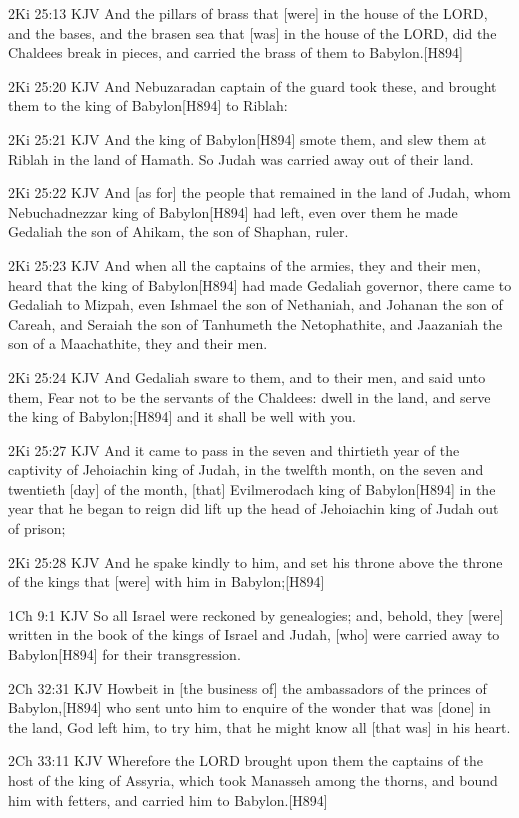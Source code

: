 \documentclass{book}
\begin{document}
2Ki 25:13 KJV
And the pillars of brass that [were] in the house of the LORD, and the bases, and the brasen sea that [was] in the house of the LORD, did the Chaldees break in pieces, and carried the brass of them to Babylon.[H894]

2Ki 25:20 KJV
And Nebuzaradan captain of the guard took these, and brought them to the king of Babylon[H894] to Riblah:

2Ki 25:21 KJV
And the king of Babylon[H894] smote them, and slew them at Riblah in the land of Hamath. So Judah was carried away out of their land.

2Ki 25:22 KJV
And [as for] the people that remained in the land of Judah, whom Nebuchadnezzar king of Babylon[H894] had left, even over them he made Gedaliah the son of Ahikam, the son of Shaphan, ruler.

2Ki 25:23 KJV
And when all the captains of the armies, they and their men, heard that the king of Babylon[H894] had made Gedaliah governor, there came to Gedaliah to Mizpah, even Ishmael the son of Nethaniah, and Johanan the son of Careah, and Seraiah the son of Tanhumeth the Netophathite, and Jaazaniah the son of a Maachathite, they and their men.

2Ki 25:24 KJV
And Gedaliah sware to them, and to their men, and said unto them, Fear not to be the servants of the Chaldees: dwell in the land, and serve the king of Babylon;[H894] and it shall be well with you.

2Ki 25:27 KJV
And it came to pass in the seven and thirtieth year of the captivity of Jehoiachin king of Judah, in the twelfth month, on the seven and twentieth [day] of the month, [that] Evilmerodach king of Babylon[H894] in the year that he began to reign did lift up the head of Jehoiachin king of Judah out of prison;

2Ki 25:28 KJV
And he spake kindly to him, and set his throne above the throne of the kings that [were] with him in Babylon;[H894]

1Ch 9:1 KJV
So all Israel were reckoned by genealogies; and, behold, they [were] written in the book of the kings of Israel and Judah, [who] were carried away to Babylon[H894] for their transgression.

2Ch 32:31 KJV
Howbeit in [the business of] the ambassadors of the princes of Babylon,[H894] who sent unto him to enquire of the wonder that was [done] in the land, God left him, to try him, that he might know all [that was] in his heart.

2Ch 33:11 KJV
Wherefore the LORD brought upon them the captains of the host of the king of Assyria, which took Manasseh among the thorns, and bound him with fetters, and carried him to Babylon.[H894]
\end{document}
